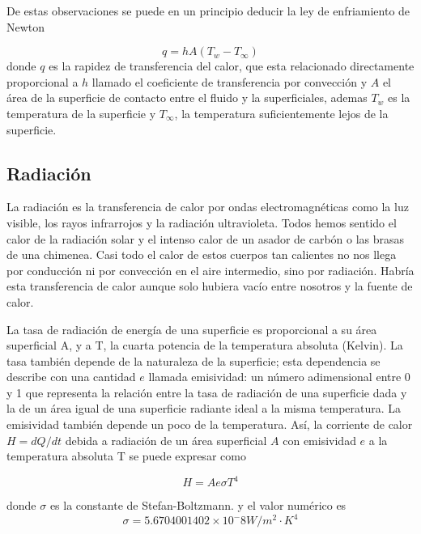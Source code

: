 De estas observaciones se puede en un principio 
    deducir la ley de enfriamiento de Newton

\begin{equation}
    \label{eq:enfriamiento-newton}
    q = hA(T_w - T_\infty)
\end{equation}
donde $q$ es la rapidez de transferencia del calor,
que esta relacionado directamente proporcional a $h$ llamado
el coeficiente de transferencia por convección y $A$ el área
de la superficie de contacto entre el fluido y la superficiales,
ademas $T_w$ es la temperatura de la superficie y $T_\infty$,
la temperatura suficientemente lejos de la superficie.

\subsection{Radiación}
La radiación es la transferencia de calor por ondas electromagnéticas como la luz visible,
los rayos infrarrojos y la radiación ultravioleta. Todos hemos sentido el calor de
la radiación solar y el intenso calor de un asador de carbón o las brasas de una chimenea.
Casi todo el calor de estos cuerpos tan calientes no nos llega por conducción ni
por convección en el aire intermedio, sino por radiación. Habría esta transferencia de
calor aunque solo hubiera vacío entre nosotros y la fuente de calor.

La tasa de radiación de energía de una superficie es proporcional a su área superficial A, y a T, la cuarta potencia de la temperatura absoluta (Kelvin). La tasa también
depende de la naturaleza de la superficie; esta dependencia se describe con una cantidad $e$ llamada emisividad: un número adimensional entre 0 y 1 que representa la
relación entre la tasa de radiación de una superficie dada y la de un área igual de una superficie radiante ideal a la misma temperatura. La emisividad también depende un poco
de la temperatura. Así, la corriente de calor $H = dQ/dt$ debida a radiación de un área
superficial $A$ con emisividad $e$ a la temperatura absoluta T se puede expresar como

\begin{equation}
    H = Ae\sigma T^4
\end{equation}

donde $\sigma$ es la constante de Stefan-Boltzmann.
y el valor numérico es
\begin{equation*}
    \sigma = 5.6704001402 \times 10^-8 W/m^2\cdot K^4 
\end{equation*}

